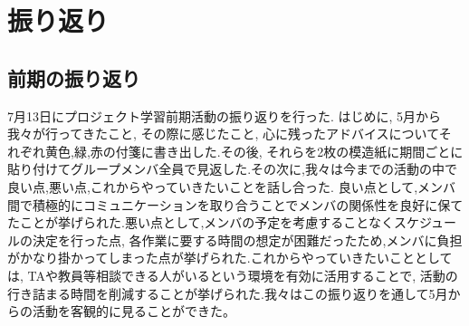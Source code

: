 \chapter{振り返り}

\section{前期の振り返り}
7月13日にプロジェクト学習前期活動の振り返りを行った. はじめに, 5月から我々が行ってきたこと, その際に感じたこと, 心に残ったアドバイスについてそれぞれ黄色,緑,赤の付箋に書き出した.その後,
それらを2枚の模造紙に期間ごとに貼り付けてグループメンバ全員で見返した.その次に,我々は今までの活動の中で良い点,悪い点,これからやっていきたいことを話し合った.
良い点として,メンバ間で積極的にコミュニケーションを取り合うことでメンバの関係性を良好に保てたことが挙げられた.悪い点として,メンバの予定を考慮することなくスケジュールの決定を行った点,
各作業に要する時間の想定が困難だったため,メンバに負担がかなり掛かってしまった点が挙げられた.これからやっていきたいこととしては, TAや教員等相談できる人がいるという環境を有効に活用することで,
活動の行き詰まる時間を削減することが挙げられた.我々はこの振り返りを通して5月からの活動を客観的に見ることができた。

